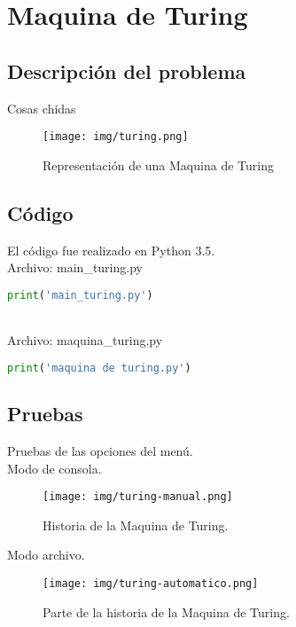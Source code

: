 \section{Maquina de Turing}
	\subsection{Descripción del problema}
	Cosas chidas
	\begin{figure}[H]
		\begin{center}
		\texttt{[image: img/turing.png]}
		\caption{Representación de una Maquina de Turing}
		\label{fig:diagrama-turing}
		\end{center}
	\end{figure}
	\subsection{Código}
	El código fue realizado en Python 3.5.
	\\Archivo: main\_turing.py
	\begin{lstlisting}[language=Python]
	print('main_turing.py')
	\end{lstlisting}
	\\Archivo: maquina\_turing.py
	\begin{lstlisting}[language=Python]
	print('maquina de turing.py')
	\end{lstlisting}
	\subsection{Pruebas}
	Pruebas de las opciones del menú.
	\\
	{\large Modo de consola.}
	\begin{figure}[H]
		\begin{center}
			\texttt{[image: img/turing-manual.png]}
			\caption{Historia de la Maquina de Turing.}
			\label{fig:turing1}
		\end{center}
	\end{figure}
	{\large Modo archivo.}
	\begin{figure}[H]
		\begin{center}
			\texttt{[image: img/turing-automatico.png]}
			\caption{Parte de la historia de la Maquina de Turing.}
			\label{fig:turing2}
		\end{center}
	\end{figure}